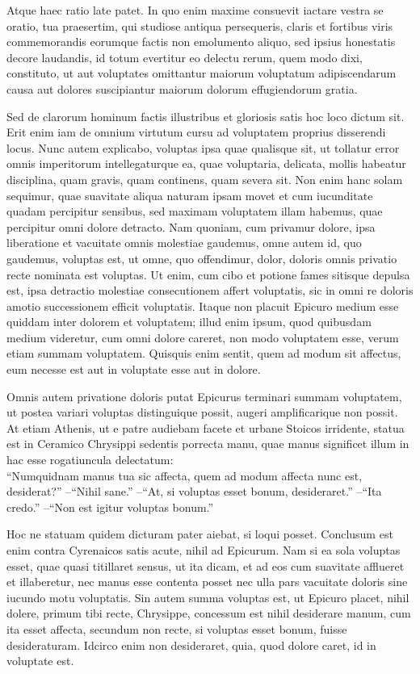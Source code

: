 Atque haec ratio late patet. In quo enim maxime consuevit iactare vestra se oratio, tua praesertim, qui studiose antiqua persequeris, claris et fortibus viris commemorandis eorumque factis non emolumento aliquo, sed ipsius honestatis decore laudandis, id totum evertitur eo delectu rerum, quem modo dixi, constituto, ut aut voluptates omittantur maiorum voluptatum adipiscendarum causa aut dolores suscipiantur maiorum dolorum effugiendorum gratia.


Sed de clarorum hominum factis illustribus et gloriosis satis hoc loco dictum sit.
Erit enim iam de omnium virtutum cursu ad voluptatem proprius disserendi locus.
Nunc autem explicabo, voluptas ipsa quae qualisque sit, ut tollatur error omnis imperitorum intellegaturque ea, quae voluptaria, delicata, mollis habeatur disciplina, quam gravis, quam continens, quam severa sit.
Non enim hanc solam sequimur, quae suavitate aliqua naturam ipsam movet et cum iucunditate quadam percipitur sensibus, sed maximam voluptatem illam habemus, quae percipitur omni dolore detracto.
%
Nam quoniam, cum privamur dolore, ipsa liberatione et vacuitate omnis molestiae gaudemus, omne autem id, quo gaudemus, voluptas est, ut omne, quo offendimur, dolor, doloris omnis privatio recte nominata est voluptas.
Ut enim, cum cibo et potione fames sitisque depulsa est, ipsa detractio molestiae consecutionem affert voluptatis, sic in omni re doloris amotio successionem efficit voluptatis.
%
Itaque non placuit Epicuro medium esse quiddam inter dolorem et voluptatem; illud enim ipsum, quod quibusdam medium videretur, cum omni dolore careret, non modo voluptatem esse, verum etiam summam voluptatem.
Quisquis enim sentit, quem ad modum sit affectus, eum necesse est aut in voluptate esse aut in dolore.

Omnis autem privatione doloris putat Epicurus terminari summam voluptatem, ut postea variari voluptas distinguique possit, augeri amplificarique non possit.
At etiam Athenis, ut e patre audiebam facete et urbane Stoicos irridente, statua est in Ceramico Chrysippi sedentis porrecta manu, quae manus significet illum in hac esse rogatiuncula delectatum:\\
``Numquidnam manus tua sic affecta, quem ad modum affecta nunc est, desiderat?''
--``Nihil sane.''
--``At, si voluptas esset bonum, desideraret.''
--``Ita credo.''
--``Non est igitur voluptas bonum.''

Hoc ne statuam quidem dicturam pater aiebat, si loqui posset.
Conclusum est enim contra Cyrenaicos satis acute, nihil ad Epicurum.
Nam si ea sola voluptas esset, quae quasi titillaret sensus, ut ita dicam, et ad eos cum suavitate afflueret et illaberetur, nec manus esse contenta posset nec ulla pars vacuitate doloris sine iucundo motu voluptatis.
Sin autem summa voluptas est, ut Epicuro placet, nihil dolere, primum tibi recte, Chrysippe, concessum est nihil desiderare manum, cum ita esset affecta, secundum non recte, si voluptas esset bonum, fuisse desideraturam.
%
Idcirco enim non desideraret, quia, quod dolore caret, id in voluptate est.
